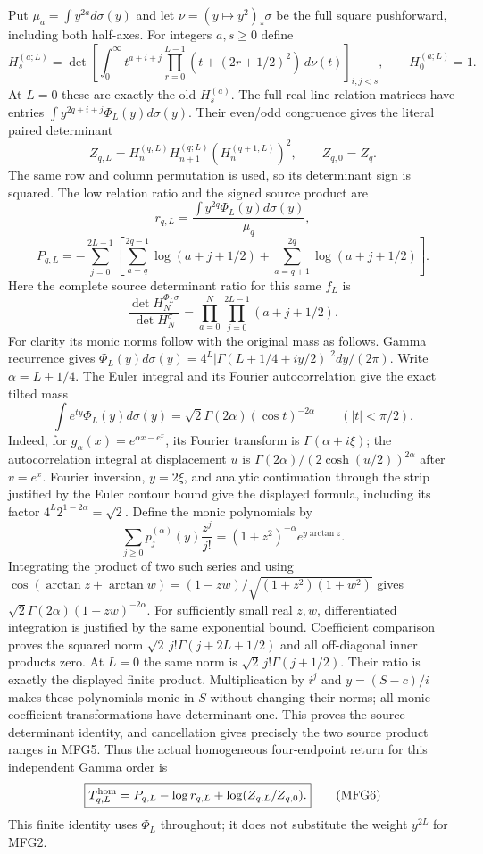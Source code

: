 \documentclass[11pt,a4paper]{article}
\begin{document}
Put $\mu_a=\int y^{2a}d\sigma(y)$ and let $\nu=(y\mapsto y^2)_*\sigma$
be the full square pushforward, including both half-axes. For integers
$a,s\ge0$ define
\[
 H_s^{(a;L)}=\det\left[
    \int_0^\infty t^{a+i+j}
             \prod_{r=0}^{L-1}(t+(2r+1/2)^2)\,d\nu(t)
                  \right]_{i,j<s},\qquad H_0^{(a;L)}=1.
 \tag{MFG3}
\]
At $L=0$ these are exactly the old $H_s^{(a)}$. The full real-line
relation matrices have entries
$\int y^{2q+i+j}\Phi_L(y)d\sigma(y)$. Their even/odd congruence gives
the literal paired determinant
\[
 Z_{q,L}=H_n^{(q;L)}H_{n+1}^{(q;L)}(H_n^{(q+1;L)})^2,
 \qquad Z_{q,0}=Z_q.
 \tag{MFG4}
\]
The same row and column permutation is used, so its determinant sign
is squared. The low relation ratio and the signed source product are
\[
 r_{q,L}=\frac{\int y^{2q}\Phi_L(y)d\sigma(y)}{\mu_q},
\]
\[
 P_{q,L}=-\sum_{j=0}^{2L-1}
 \left[\sum_{a=q}^{2q-1}\log(a+j+1/2)
       +\sum_{a=q+1}^{2q}\log(a+j+1/2)\right].
 \tag{MFG5}
\]
Here the complete source determinant ratio for this same $f_L$ is
\[
 \frac{\det H_N^{\Phi_L\sigma}}{\det H_N^\sigma}
 =\prod_{a=0}^N\prod_{j=0}^{2L-1}(a+j+1/2).
\]
For clarity its monic norms follow with the original mass as follows.
Gamma recurrence gives
$\Phi_L(y)d\sigma(y)=4^L|\Gamma(L+1/4+iy/2)|^2dy/(2\pi)$.
Write $\alpha=L+1/4$. The Euler integral and its Fourier
autocorrelation give the exact tilted mass
\[
 \int e^{ty}\Phi_L(y)d\sigma(y)
       =\sqrt2\Gamma(2\alpha)(\cos t)^{-2\alpha}
       \qquad(|t|<\pi/2).
\]
Indeed, for $g_\alpha(x)=e^{\alpha x-e^x}$, its Fourier transform is
$\Gamma(\alpha+i\xi)$; the autocorrelation integral at displacement
$u$ is $\Gamma(2\alpha)/(2\cosh(u/2))^{2\alpha}$ after $v=e^x$.
Fourier inversion, $y=2\xi$, and analytic continuation through the
strip justified by the Euler contour bound give the displayed formula,
including its factor $4^L2^{1-2\alpha}=\sqrt2$.
Define the monic polynomials by
\[
 \sum_{j\ge0}p_j^{(\alpha)}(y)\frac{z^j}{j!}
       =(1+z^2)^{-\alpha}e^{y\arctan z}.
\]
Integrating the product of two such series and using
$\cos(\arctan z+\arctan w)=(1-zw)/\sqrt{(1+z^2)(1+w^2)}$
gives $\sqrt2\Gamma(2\alpha)(1-zw)^{-2\alpha}$.
For sufficiently small real $z,w$, differentiated integration is
justified by the same exponential bound. Coefficient comparison
proves the squared norm $\sqrt2\,j!\Gamma(j+2L+1/2)$ and all
off-diagonal inner products zero. At $L=0$ the same norm is
$\sqrt2\,j!\Gamma(j+1/2)$. Their ratio is exactly the displayed
finite product. Multiplication by $i^j$ and $y=(S-c)/i$ makes these
polynomials monic in $S$ without changing their norms; all monic
coefficient transformations have determinant one. This proves the
source determinant identity, and cancellation gives precisely the
two source product ranges in MFG5. Thus the actual homogeneous
four-endpoint return for this independent Gamma order is
\[
 \boxed{T_{q,L}^{\rm hom}
       =P_{q,L}-\log r_{q,L}+\log(Z_{q,L}/Z_{q,0}).}
 \tag{MFG6}
\]
This finite identity uses $\Phi_L$ throughout; it does not substitute
the weight $y^{2L}$ for MFG2.
\end{document}
